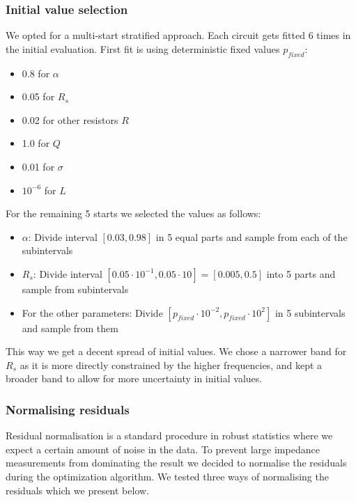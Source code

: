 \documentclass[
    11pt,
    a4paper,
    oneside
]{article}
\begin{document}
\subsubsection{Initial value selection}

We opted for a multi-start stratified approach. Each circuit gets fitted 6 times in the initial evaluation. First fit is using deterministic
fixed values $p_{fixed}$:

\begin{itemize}
    \item 0.8 for $\alpha$
    \item 0.05 for $R_s$
    \item 0.02 for other resistors $R$
    \item 1.0 for $Q$
    \item 0.01 for $\sigma$
    \item $10^{-6}$ for $L$
\end{itemize}

For the remaining 5 starts we selected the values as follows:
\begin{itemize}
    \item $\alpha$: Divide interval $[0.03,0.98]$ in 5 equal parts and sample from each of the subintervals
    \item $R_s$: Divide interval $[0.05\cdot10^{-1},0.05\cdot10]=[0.005,0.5]$ into 5 parts and sample from subintervals
    \item For the other parameters: Divide $[p_{fixed}\cdot10^{-2},p_{fixed}\cdot10^{2}]$ in 5 subintervals and sample from them
\end{itemize}

This way we get a decent spread of initial values. We chose a narrower band for $R_s$ as it is more directly constrained by the higher frequencies,
and kept a broader band to allow for more uncertainty in initial values.

\subsubsection{Normalising residuals}\label{normalisation}

Residual normalisation is a standard procedure in robust statistics where we expect a certain amount of noise in the data.
To prevent large impedance measurements from dominating the result we decided to normalise the residuals during the optimization algorithm.
We tested three ways of normalising the residuals which we present below. 
\end{document}
